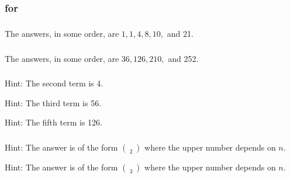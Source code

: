 
%

\subsection{\answers}

\subsubsection{\answers for  \subarithtri}

\subsubsection*{ \answers}
The answers, in some order, are $1, 1, 4, 8, 10,$ and 21.

\subsubsection*{ \answers}
The answers, in some order, are $36, 126, 210,$ and 252.

\subsubsection*{ \answers}
\begin{apart}
    \item Hint: The second term is 4.
    \item Hint: The third term is 56.
    \item Hint: The fifth term is 126.
\end{apart}

\subsubsection*{ \answers}
\begin{apart}
    \item Hint: The answer is of the form $\binom{\quad}{2}$ where the upper number depends on $n$.
    \item Hint: The answer is of the form $\binom{\quad}{3}$ where the upper number depends on $n$.
\end{apart}

